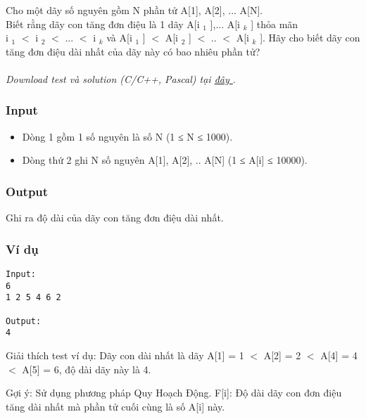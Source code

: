 



   Cho một dãy số nguyên gồm N phần tử A[1], A[2], ... A[N].   
\\   Biết rằng dãy con tăng đơn điệu là 1 dãy A[i   $_    1   $   ],... A[i   $_    k   $   ] thỏa mãn   
\\   i   $_    1   $   $<$ i   $_    2   $   $<$ ... $<$ i   $_    k   $   và A[i   $_    1   $   ] $<$ A[i   $_    2   $   ] $<$ .. $<$ A[i   $_    k   $   ]. Hãy cho biết dãy con tăng đơn điệu dài nhất của dãy này có bao nhiêu phần tử?   
\\
\\\textit{    Download test và solution (C/C++, Pascal) tại    \href{https://vn.spoj.pl/content/liq.zip}{     đây    }}   .  

\subsubsection{   Input  }
\begin{itemize}
	\item     Dòng 1 gồm 1 số nguyên là số N (1 ≤ N ≤ 1000).   
	\item     Dòng thứ 2 ghi N số nguyên A[1], A[2], .. A[N] (1 ≤ A[i] ≤ 10000).   
\end{itemize}

\subsubsection{   Output  }

   Ghi ra độ dài của dãy con tăng đơn điệu dài nhất.  

\subsubsection{   Ví dụ  }
\begin{verbatim}
Input:
6
1 2 5 4 6 2 

Output:
4
\end{verbatim}

       Giải thích test ví dụ:      Dãy con dài nhất là dãy A[1] = 1 $<$ A[2] = 2 $<$ A[4] = 4 $<$ A[5] = 6, độ dài dãy này là 4.  

       Gợi ý:      Sử dụng phương pháp Quy Hoạch Động. F[i]: Độ dài dãy con đơn điệu tăng dài nhất mà phần tử cuối cùng là số A[i] này.  